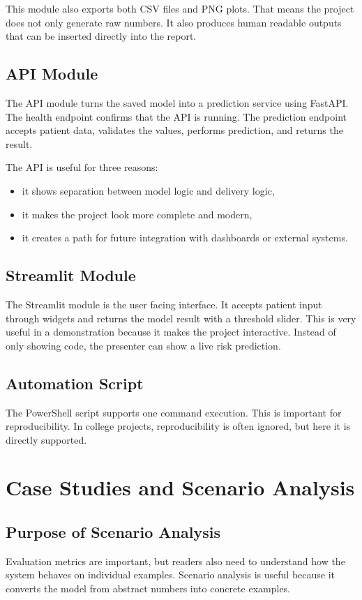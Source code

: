 \documentclass[12pt,a4paper,openany]{report}
\begin{document}
    This module also exports both CSV files and PNG plots. That means the project does not only generate raw numbers. It also produces human readable outputs that can be inserted directly into the report.

    \section{API Module}
    The API module turns the saved model into a prediction service using FastAPI. The health endpoint confirms that the API is running. The prediction endpoint accepts patient data, validates the values, performs prediction, and returns the result.

    The API is useful for three reasons:
    \begin{itemize}[leftmargin=1.4cm]
    \item it shows separation between model logic and delivery logic,
    \item it makes the project look more complete and modern,
    \item it creates a path for future integration with dashboards or external systems.
    \end{itemize}

    \section{Streamlit Module}
    The Streamlit module is the user facing interface. It accepts patient input through widgets and returns the model result with a threshold slider. This is very useful in a demonstration because it makes the project interactive. Instead of only showing code, the presenter can show a live risk prediction.

    \section{Automation Script}
    The PowerShell script supports one command execution. This is important for reproducibility. In college projects, reproducibility is often ignored, but here it is directly supported.

    \chapter{Case Studies and Scenario Analysis}
    \section{Purpose of Scenario Analysis}
    Evaluation metrics are important, but readers also need to understand how the system behaves on individual examples. Scenario analysis is useful because it converts the model from abstract numbers into concrete examples.
\end{document}
